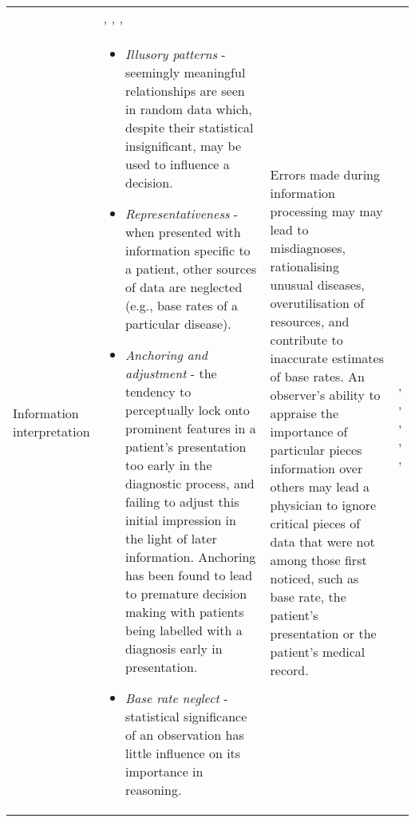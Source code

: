 \documentclass{sigchi}
\begin{document}
\begin{table*}
\begin{tabular}{>{\raggedright}p{1.9cm} p{7.5cm} p{5.8cm} p{1.4cm}}
    & \cite{Reay2013}, \cite{Kahneman2012}, \cite{Croskerry2002},  \\
    
    Information interpretation %
    &   \begin{itemize} \parskip0pt \vspace{-2.4mm}
            \item \textit{Illusory patterns} - seemingly meaningful relationships are seen in random data which, despite their statistical insignificant, may be used to influence a decision.
            \item \textit{Representativeness} - when presented with information specific to a patient, other sources of data are neglected (e.g., base rates of a particular disease).
            \item \textit{Anchoring and adjustment} - the tendency to perceptually lock onto prominent features in a patient’s presentation too early in the diagnostic process, and failing to adjust this initial impression in the light of later information. Anchoring has been found to lead to premature decision making with patients being labelled with a diagnosis early in presentation.
            \item \textit{Base rate neglect} - statistical significance of an observation has little influence on its importance in reasoning.
        \end{itemize}
    & Errors made during information processing may may lead to misdiagnoses, rationalising unusual diseases, overutilisation of resources, and contribute to inaccurate estimates of base rates. An observer's ability to appraise the importance of particular pieces information over others may lead a physician to ignore critical pieces of data that were not among those first noticed, such as base rate, the patient's presentation or the patient's medical record.
    & \cite{Whitson2008}, \cite{Kahneman2012}, \cite{Kahneman1978}, \cite{Bar-Hillel1980}, \cite{Croskerry2002}, \cite{Gruber} \\
    

\end{tabular}
\end{table*}
\end{document}
